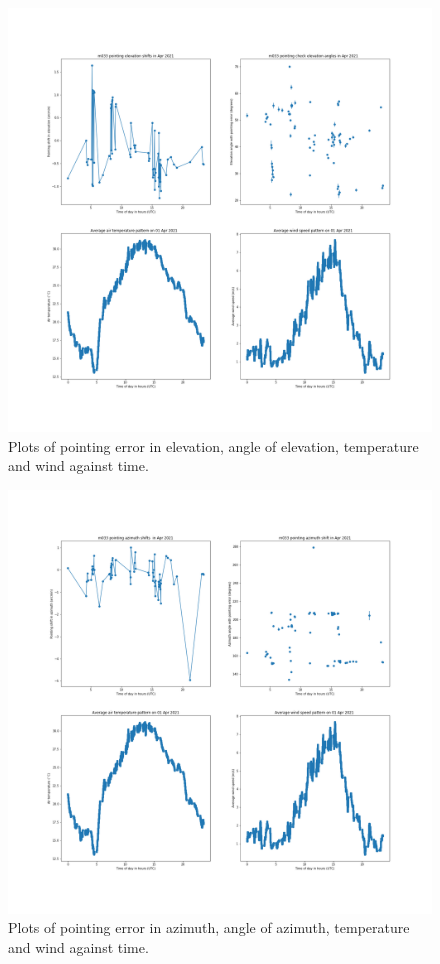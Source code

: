 \documentclass{article}
\begin{document}
\begin{figure}[H]
	\centering
	\includegraphics[scale=0.35]{m033_elev_Apr.png}
	
	\caption{Plots of pointing error in elevation, angle of elevation, temperature and wind against time.}
	\label{fig:m033ElevApr}
\end{figure}

\begin{figure}[H]
	\centering
	\includegraphics[scale=0.35]{m033_azim_Apr.png}
	
	\caption{Plots of pointing error in azimuth, angle of azimuth, temperature and wind against time.}
	\label{fig:m033AzimApr}
\end{figure}
\end{document}

